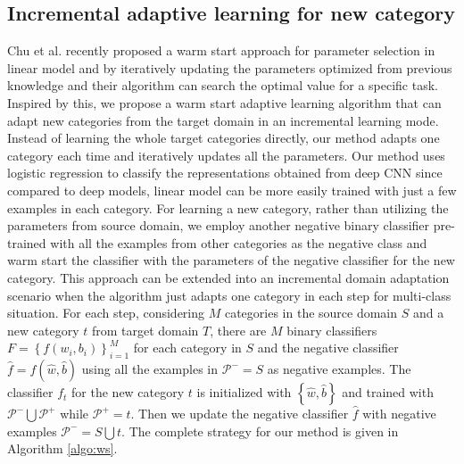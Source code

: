 \subsection{Incremental adaptive learning for new category}
Chu et al. recently proposed a warm start approach for parameter selection in linear model and by iteratively updating the parameters optimized from previous knowledge and their algorithm can search the optimal value for a specific task\cite{chuwarm}. Inspired by this, we propose a warm start adaptive learning algorithm that can adapt new categories from the target domain in an incremental learning mode. Instead of learning the whole target categories directly, our method adapts one category each time and iteratively updates all the parameters.
Our method uses logistic regression to classify the representations obtained from deep CNN since compared to deep models, linear model can be more easily trained with just a few examples in each category.
For learning a new category, rather than utilizing the parameters from source domain, we employ another negative binary classifier pre-trained with all the examples from other categories as the negative class and warm start the classifier with the parameters of the negative classifier for the new category. This approach can be extended into an incremental domain adaptation scenario when the algorithm just adapts one category in each step for multi-class situation. For each step, considering $M$ categories in the source domain $S$ and a new category $t$ from target domain $T$, there are $M$ binary classifiers $F=\left\{ {{f}\left( {{w_i},{b_i}} \right)} \right\}_{i = 1}^M$ for each category in $S$ and the negative classifier $\hat{f}=f(\hat{w},\hat{b})$ using all the examples in $\mathcal{P^-}=S$ as negative examples. The classifier $f_t$ for the new category $t$ is initialized with $\left\{\hat{w},\hat{b}\right\}$ and trained with $\mathcal{P^-}\bigcup\mathcal{P^+}$ while $\mathcal{P^+}=t$. Then we update the negative classifier $\hat{f}$ with negative examples $\mathcal{P^-}=S\bigcup t$. The complete strategy for our method is given in Algorithm \ref{algo:ws}.
